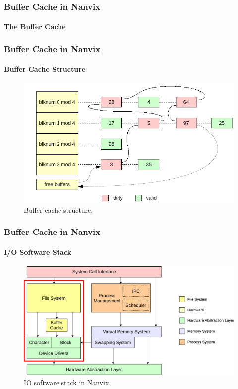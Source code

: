 \documentclass{beamer}
\begin{document}
	\begin{frame}
	\frametitle{Buffer Cache in Nanvix}
	\framesubtitle{The Buffer Cache}
		\begin{itemize}
		\setlength\itemsep{1.5em}
		\end{itemize}
	\end{frame}

	\begin{frame}
	\frametitle{Buffer Cache in Nanvix}
	\framesubtitle{Buffer Cache Structure}
		\begin{figure}
			\centering
			\includegraphics[width=0.9\linewidth]{buffer-cache}
			\caption{Buffer cache structure.}
		\end{figure}
	\end{frame}

	\begin{frame}
	\frametitle{Buffer Cache in Nanvix}
	\framesubtitle{I/O Software Stack}
		\begin{figure}
			\centering
			\includegraphics[width=0.9\linewidth]{io-software-stack}
			\caption{IO software stack in Nanvix.}
		\end{figure}
	\end{frame}
\end{document}
